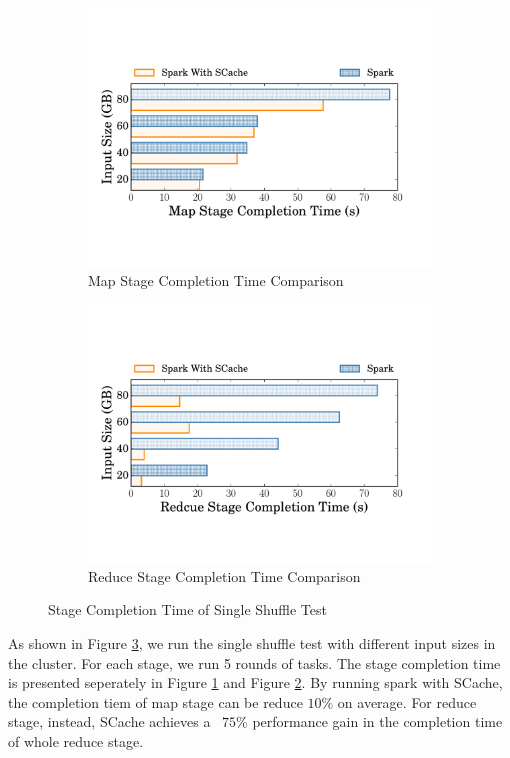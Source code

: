 \begin{figure}
	\begin{subfigure}{\linewidth}
		\centering
		\includegraphics[width=0.9\linewidth]{fig/groupbymapstage}
		\caption{Map Stage Completion Time Comparison}
		\label{fig:mapstage}
	\end{subfigure}
	\begin{subfigure}{\linewidth}
		\centering
		\includegraphics[width=0.9\linewidth]{fig/groupbyreducestage}
		\caption{Reduce Stage Completion Time Comparison}
		\label{fig:reducestage}
	\end{subfigure}
	\caption{Stage Completion Time of Single Shuffle Test}
	\label{fig:singleshuffle}
\end{figure}
As shown in Figure \ref{fig:singleshuffle}, we run the single shuffle test with different input sizes in the cluster. For each stage, we run 5 rounds of tasks. The stage completion time is presented seperately in Figure \ref{fig:mapstage} and Figure \ref{fig:reducestage}. By running spark with SCache, the completion tiem of map stage can be reduce $10\%$ on average. For reduce stage, instead, SCache achieves a ~$75\%$ performance gain in the completion time of whole reduce stage.


